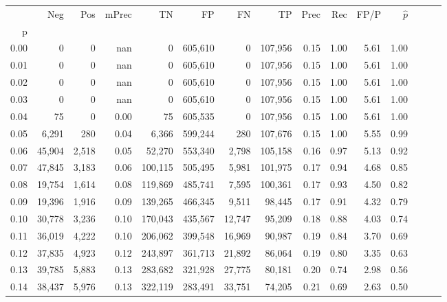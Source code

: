\begin{tabular}{rrrrrrrrrrrrrrr}
\toprule
{} &     Neg &    Pos & mPrec &       TN &       FP &       FN &       TP &  Prec &   Rec &  FP/P & $\hat{p}$ \\
p    &         &        &       &          &          &          &          &       &       &       &           \\
\midrule
0.00 &       0 &      0 &   nan &        0 &  605,610 &        0 &  107,956 &  0.15 &  1.00 &  5.61 &      1.00 \\
0.01 &       0 &      0 &   nan &        0 &  605,610 &        0 &  107,956 &  0.15 &  1.00 &  5.61 &      1.00 \\
0.02 &       0 &      0 &   nan &        0 &  605,610 &        0 &  107,956 &  0.15 &  1.00 &  5.61 &      1.00 \\
0.03 &       0 &      0 &   nan &        0 &  605,610 &        0 &  107,956 &  0.15 &  1.00 &  5.61 &      1.00 \\
0.04 &      75 &      0 &  0.00 &       75 &  605,535 &        0 &  107,956 &  0.15 &  1.00 &  5.61 &      1.00 \\
0.05 &   6,291 &    280 &  0.04 &    6,366 &  599,244 &      280 &  107,676 &  0.15 &  1.00 &  5.55 &      0.99 \\
0.06 &  45,904 &  2,518 &  0.05 &   52,270 &  553,340 &    2,798 &  105,158 &  0.16 &  0.97 &  5.13 &      0.92 \\
0.07 &  47,845 &  3,183 &  0.06 &  100,115 &  505,495 &    5,981 &  101,975 &  0.17 &  0.94 &  4.68 &      0.85 \\
0.08 &  19,754 &  1,614 &  0.08 &  119,869 &  485,741 &    7,595 &  100,361 &  0.17 &  0.93 &  4.50 &      0.82 \\
0.09 &  19,396 &  1,916 &  0.09 &  139,265 &  466,345 &    9,511 &   98,445 &  0.17 &  0.91 &  4.32 &      0.79 \\
0.10 &  30,778 &  3,236 &  0.10 &  170,043 &  435,567 &   12,747 &   95,209 &  0.18 &  0.88 &  4.03 &      0.74 \\
0.11 &  36,019 &  4,222 &  0.10 &  206,062 &  399,548 &   16,969 &   90,987 &  0.19 &  0.84 &  3.70 &      0.69 \\
0.12 &  37,835 &  4,923 &  0.12 &  243,897 &  361,713 &   21,892 &   86,064 &  0.19 &  0.80 &  3.35 &      0.63 \\
0.13 &  39,785 &  5,883 &  0.13 &  283,682 &  321,928 &   27,775 &   80,181 &  0.20 &  0.74 &  2.98 &      0.56 \\
0.14 &  38,437 &  5,976 &  0.13 &  322,119 &  283,491 &   33,751 &   74,205 &  0.21 &  0.69 &  2.63 &      0.50 \\

\end{tabular}
